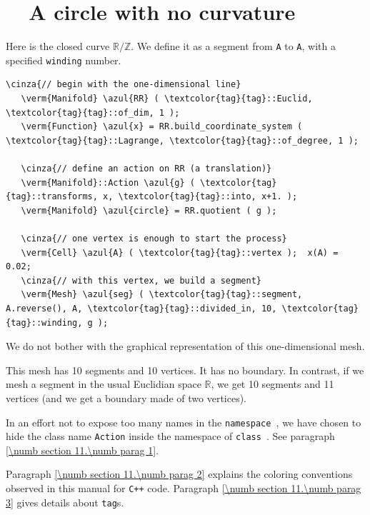 \section{~~A circle with no curvature}\label{\numb section 7.\numb parag 1}

Here is the closed curve $ \mathbb{R}/{\mathbb Z} $.
We define it as a segment from {\small\tt A} to {\small\tt A}, with a specified {\small\tt winding} number.

\begin{Verbatim}[commandchars=\\\{\},formatcom=\small\tt,frame=single,
   label=parag-\ref{\numb section 7.\numb parag 2}.cpp,rulecolor=\color{coment},
   baselinestretch=0.94,framesep=2mm                                            ]
   \cinza{// begin with the one-dimensional line}
   \verm{Manifold} \azul{RR} ( \textcolor{tag}{tag}::Euclid, \textcolor{tag}{tag}::of_dim, 1 );
   \verm{Function} \azul{x} = RR.build_coordinate_system ( \textcolor{tag}{tag}::Lagrange, \textcolor{tag}{tag}::of_degree, 1 );

   \cinza{// define an action on RR (a translation)}
   \verm{Manifold}::Action \azul{g} ( \textcolor{tag}{tag}::transforms, x, \textcolor{tag}{tag}::into, x+1. );
   \verm{Manifold} \azul{circle} = RR.quotient ( g );

   \cinza{// one vertex is enough to start the process}
   \verm{Cell} \azul{A} ( \textcolor{tag}{tag}::vertex );  x(A) = 0.02;
   \cinza{// with this vertex, we build a segment}
   \verm{Mesh} \azul{seg} ( \textcolor{tag}{tag}::segment, A.reverse(), A, \textcolor{tag}{tag}::divided_in, 10, \textcolor{tag}{tag}::winding, g );
\end{Verbatim}

We do not bother with the graphical representation of this one-dimensional mesh.

This mesh has 10 segments and 10 vertices. It has no boundary.
In contrast, if we mesh a segment in the usual Euclidian space $ \mathbb{R} $,
we get 10 segments and 11 vertices (and we get a boundary made of two vertices).

In an effort not to expose too many names in the {\small\tt namespace },
we have chosen to hide the class name {\small\tt Action} inside the namespace of
{\small\tt class }.
See paragraph \ref{\numb section 11.\numb parag 1}.

Paragraph \ref{\numb section 11.\numb parag 2} explains the coloring conventions observed
in this manual for {\tt C++} code.
Paragraph \ref{\numb section 11.\numb parag 3} gives details about
{\small\tt\textcolor{tag}{tag}}s.


